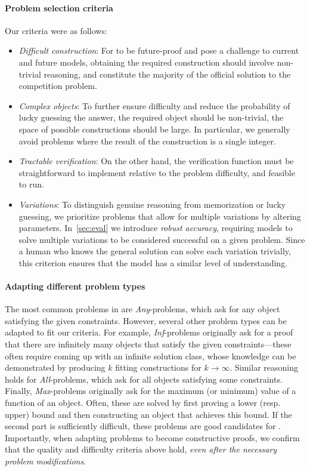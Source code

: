 \paragraph{Problem selection criteria} Our criteria were as follows:
\vspace{-3mm}
\begin{itemize}\setlength\itemsep{0.02em}
    \item \emph{Difficult construction}: 
    For \mc{} to be future-proof and pose a challenge to current and future models, obtaining the required construction should involve non-trivial reasoning, and constitute the majority of the official solution to the competition problem.
    \item \emph{Complex objects}: To further ensure difficulty and reduce the probability of lucky guessing the answer, the required object should be non-trivial, \ie the space of possible constructions should be large. In particular, we generally avoid problems where the result of the construction is a single integer.
    \item \emph{Tractable verification}: On the other hand, the verification function must be straightforward to implement relative to the problem difficulty, and feasible to run. 
    \item \emph{Variations}: To distinguish genuine reasoning from memorization or lucky guessing, we prioritize problems that allow for multiple variations by altering parameters. In~\cref{sec:eval} we introduce \emph{robust accuracy}, requiring models to solve multiple variations to be considered successful on a given problem. Since a human who knows the general solution can solve each variation trivially, this criterion ensures that the model has a similar level of understanding. 
\end{itemize}

\paragraph{Adapting different problem types}
The most common problems in \mc{} are \emph{Any}-problems, which ask for any object satisfying the given constraints.
However, several other problem types can be adapted to fit our criteria.
For example, \emph{Inf}-problems originally ask for a proof that there are infinitely many objects that satisfy the given constraints---these often require coming up with an infinite solution class, whose knowledge can be demonstrated by producing $k$ fitting constructions for $k \to \infty$. 
Similar reasoning holds for \emph{All}-problems, which ask for all objects satisfying some constraints.
Finally, \emph{Max}-problems originally ask for the maximum (or minimum) value of a function of an object. Often, these are solved by first proving a lower (resp. upper) bound and then constructing an object that achieves this bound.
If the second part is sufficiently difficult, these problems are good candidates for \mc{}. 
Importantly, when adapting problems to become constructive proofs, we confirm that the quality and difficulty criteria above hold, \emph{even after the necessary problem modifications}.

